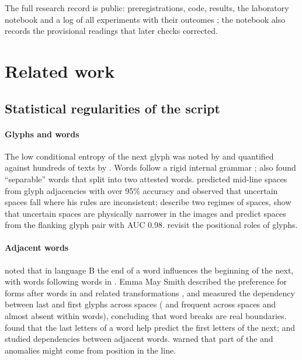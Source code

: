 \noindent The full research record is public: preregistrations, code, results, the laboratory notebook and a log of
all experiments with their outcomes \citep{repository}; the notebook also records the provisional readings that later
checks corrected.

\section{Related work}
\label{sec:related}

\subsection{Statistical regularities of the script}

\paragraph{Glyphs and words} The low conditional entropy of the next glyph was noted by \citet{bennett1976} and
quantified against hundreds of texts by \citet{lindemannbowern2020}. Words follow a rigid internal grammar
\citep{stolfi2000,zattera2022}; \citet{zattera2022} also found ``separable'' words that split into two attested words.
\citet{feaster2020} predicted mid-line spaces from glyph adjacencies with over 95\% accuracy and observed that uncertain
spaces fall where his rules are inconsistent; \citet{rozanova2026} describe two regimes of spaces, show that uncertain
spaces are physically narrower in the images and predict spaces from the flanking glyph pair with AUC 0.98.
\citet{matlach2022} revisit the positional roles of glyphs.

\paragraph{Adjacent words} \citet{currier1976} noted that in language B the end of a word influences the beginning of
the next, with  words following words in . Emma May Smith described the preference for  forms
after words in  and related transformations \citep{smith2017o,smith2017lastfirst}, and \citet{smithponzi2019}
measured the dependency between last and first glyphs across spaces ( and  frequent across spaces and
almost absent within words), concluding that word breaks are real boundaries. \citet{reddy2011} found that the last
letters of a word help predict the first letters of the next; \citet{caruana2022} and \citet{parisel2026a} studied
dependencies between adjacent words. \citet{feaster2022} warned that part of the  and  anomalies might
come from position in the line.

